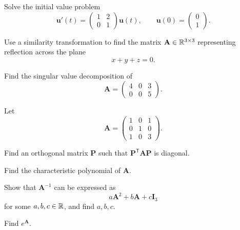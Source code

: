 \begin{problem}
Solve the initial value problem
\[
\mathbf u'(t)=
\begin{pmatrix}
1&2\\
0&1
\end{pmatrix}\mathbf u(t),
\qquad
\mathbf u(0)=
\begin{pmatrix}
0\\1
\end{pmatrix}.
\]
\end{problem}

\begin{problem}
Use a similarity transformation to find the matrix $\mathbf A\in\mathbb{R}^{3\times3}$ representing reflection across the plane
\[
x+y+z=0.
\]
\end{problem}

\begin{problem}
Find the singular value decomposition of
\[
\mathbf A=
\begin{pmatrix}
4&0&3\\
0&0&5
\end{pmatrix}.
\]
\end{problem}

\begin{problem}
Let
\[
\mathbf A=
\begin{pmatrix}
1&0&1\\
0&1&0\\
1&0&3
\end{pmatrix}.
\]
\begin{problemsubparts}
\item Find an orthogonal matrix $\mathbf P$ such that $\mathbf P^{\mathsf T}\mathbf A\mathbf P$ is diagonal.
\item Find the characteristic polynomial of $\mathbf A$.
\item Show that $\mathbf A^{-1}$ can be expressed as
\[
a\mathbf A^2+b\mathbf A+c\mathbf I_3
\]
for some $a,b,c\in\mathbb{R}$, and find $a,b,c$.
\item Find $e^{\mathbf A}$.
\end{problemsubparts}
\end{problem}

